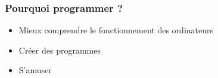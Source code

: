 \documentclass{beamer}
\begin{document}
\begin{frame}
    \frametitle{Pourquoi programmer ?}
    \begin{itemize}
        \item Mieux comprendre le fonctionnement des ordinateurs
        \item Créer des programmes
        \item S'amuser
    \end{itemize}
\end{frame}
\end{document}
